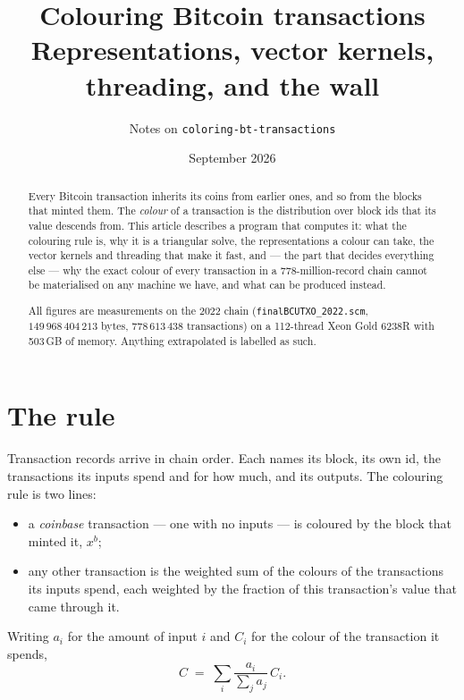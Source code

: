 \documentclass[11pt,a4paper]{article}
\title{Colouring Bitcoin transactions\\
       \large Representations, vector kernels, threading, and the wall}
\author{Notes on \texttt{coloring-bt-transactions}}
\date{September 2026}
\begin{document}
\maketitle

\begin{abstract}
Every Bitcoin transaction inherits its coins from earlier ones, and so from the
blocks that minted them. The \emph{colour} of a transaction is the distribution
over block ids that its value descends from. This article describes a program
that computes it: what the colouring rule is, why it is a triangular solve, the
representations a colour can take, the vector kernels and threading that make it
fast, and --- the part that decides everything else --- why the exact colour of
every transaction in a 778-million-record chain cannot be materialised on any
machine we have, and what can be produced instead.

All figures are measurements on the 2022 chain
(\texttt{finalBCUTXO\_2022.scm}, $149\,968\,404\,213$ bytes, $778\,613\,438$
transactions) on a 112-thread Xeon Gold 6238R with 503\,GB of memory. Anything
extrapolated is labelled as such.
\end{abstract}

\tableofcontents

\section{The rule}

Transaction records arrive in chain order. Each names its block, its own id, the
transactions its inputs spend and for how much, and its outputs. The colouring
rule is two lines:

\begin{itemize}
  \item a \emph{coinbase} transaction --- one with no inputs --- is coloured by
        the block that minted it, $x^{b}$;
  \item any other transaction is the weighted sum of the colours of the
        transactions its inputs spend, each weighted by the fraction of this
        transaction's value that came through it.
\end{itemize}

Writing $a_i$ for the amount of input $i$ and $C_i$ for the colour of the
transaction it spends,
\begin{equation}
  C \;=\; \sum_i \frac{a_i}{\sum_j a_j}\, C_i .
  \label{eq:rule}
\end{equation}
\end{document}
